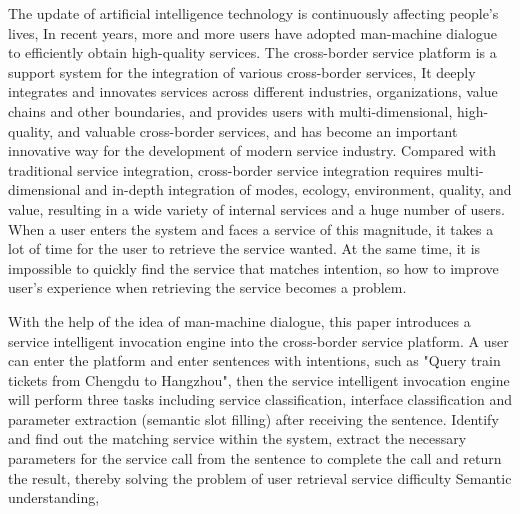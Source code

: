 \begin{englishabstract}
The update of artificial intelligence technology is continuously affecting people's lives,
In recent years, more and more users have adopted man-machine dialogue to efficiently obtain high-quality services. 
The cross-border service platform is a support system for the integration of various cross-border services,
It deeply integrates and innovates services across different industries, organizations, value chains and other boundaries, 
and provides users with multi-dimensional, high-quality, and valuable cross-border services, 
and has become an important innovative way for the development of modern service industry. 
Compared with traditional service integration, cross-border service integration requires multi-dimensional 
and in-depth integration of modes, ecology, environment, quality, and value, 
resulting in a wide variety of internal services and a huge number of users. 
When a user enters the system and faces a service of this magnitude, it takes a lot of time for the user to retrieve the service wanted.
At the same time, it is impossible to quickly find the service that matches intention, 
so how to improve user's experience when retrieving the service becomes a problem.

With the help of the idea of ​​man-machine dialogue, this paper introduces a service intelligent invocation engine into the cross-border service platform. 
A user can enter the platform and enter sentences with intentions, such as "Query train tickets from Chengdu to Hangzhou",
then the service intelligent invocation engine will perform three tasks including service classification, interface classification 
and parameter extraction (semantic slot filling) after receiving the sentence. 
Identify and find out the matching service within the system, extract the necessary parameters for the service call from the sentence to complete the call and return the result, thereby solving the problem of user retrieval service difficulty
Semantic understanding, 


\end{englishabstract}
